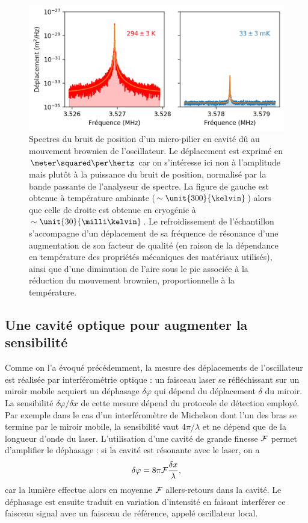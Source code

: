 \documentclass[12pt,a4paper]{article}
\begin{document}
\begin{figure}
\center
\includegraphics[scale=0.75]{figures/thermal_peak_def_filled.png}
\caption{Spectres du bruit de position d'un micro-pilier en cavité dû au mouvement brownien de l'oscillateur.
Le déplacement est exprimé en $\meter\squared\per\hertz$ car on s'intéresse ici non à l'amplitude mais plutôt à la puissance du bruit de position, normalisé par la bande passante de l'analyseur de spectre.
La figure de gauche est obtenue à température ambiante ($\sim\unit{300}{\kelvin}$) alors que celle de droite est obtenue en cryogénie à $\sim\unit{30}{\milli\kelvin}$.
Le refroidissement de l'échantillon s'accompagne d'un déplacement de sa fréquence de résonance d'une augmentation de son facteur de qualité (en raison de la dépendance en température des propriétés mécaniques des matériaux utilisés), ainsi que d'une diminution de l'aire sous le pic associée à la réduction du mouvement brownien, proportionnelle à la température.}
\label{fig:thermal_noise}
\end{figure}

\subsection{Une cavité optique pour augmenter la sensibilité}

Comme on l'a évoqué précédemment, la mesure des déplacements de l'oscillateur est réalisée par interférométrie optique : un faisceau laser se réfléchissant sur un miroir mobile acquiert un déphasage $\delta\varphi$ qui dépend du déplacement $\delta$ du miroir.
La sensibilité $\delta\varphi / \delta x$ de cette mesure dépend du protocole de détection employé.
Par exemple dans le cas d'un interféromètre de Michelson dont l'un des bras se termine par le miroir mobile, la sensibilité vaut $4\pi/\lambda$ et ne dépend que de la longueur d'onde du laser.
L'utilisation d'une cavité de grande finesse $\cal{F}$ permet d'amplifier le déphasage : si la cavité est résonante avec le laser, on a
\begin{equation}
\delta \varphi = 8\pi{\cal{F}}\frac{\delta x}{\lambda},
\end{equation}
car la lumière effectue alors en moyenne ${\cal{F}}$ allers-retours dans la cavité.
Le déphasage est ensuite traduit en variation d'intensité en faisant interférer ce faisceau signal avec un faisceau de référence, appelé oscillateur local.
\end{document}
